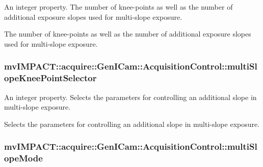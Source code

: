 An integer property. The number of knee-\/points as well as the number of additional exposure slopes used for multi-\/slope exposure. 

The number of knee-\/points as well as the number of additional exposure slopes used for multi-\/slope exposure. \hypertarget{classmv_i_m_p_a_c_t_1_1acquire_1_1_gen_i_cam_1_1_acquisition_control_ab127490b47734b9979d17ffec2c803e0}{
\subsubsection[{multi\+Slope\+Knee\+Point\+Selector}]{ mv\+I\+M\+P\+A\+C\+T\+::acquire\+::\+Gen\+I\+Cam\+::\+Acquisition\+Control\+::multi\+Slope\+Knee\+Point\+Selector}}\label{classmv_i_m_p_a_c_t_1_1acquire_1_1_gen_i_cam_1_1_acquisition_control_ab127490b47734b9979d17ffec2c803e0}


An integer property. Selects the parameters for controlling an additional slope in multi-\/slope exposure. 

Selects the parameters for controlling an additional slope in multi-\/slope exposure. \hypertarget{classmv_i_m_p_a_c_t_1_1acquire_1_1_gen_i_cam_1_1_acquisition_control_a4b9b632e3144d6dd2976c55e87528a53}{
\subsubsection[{multi\+Slope\+Mode}]{ mv\+I\+M\+P\+A\+C\+T\+::acquire\+::\+Gen\+I\+Cam\+::\+Acquisition\+Control\+::multi\+Slope\+Mode}}\label{classmv_i_m_p_a_c_t_1_1acquire_1_1_gen_i_cam_1_1_acquisition_control_a4b9b632e3144d6dd2976c55e87528a53}


